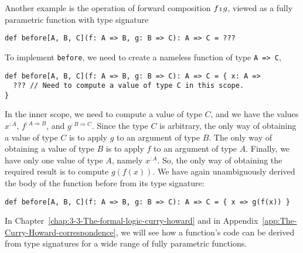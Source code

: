 Another example is the operation of forward composition $f\bef g$,
viewed as a fully parametric function with type signature
\begin{lstlisting}
def before[A, B, C](f: A => B, g: B => C): A => C = ???
\end{lstlisting}
To implement \lstinline!before!, we need to create a nameless function
of type \lstinline!A => C!,
\begin{lstlisting}
def before[A, B, C](f: A => B, g: B => C): A => C = { x: A =>
  ??? // Need to compute a value of type C in this scope.
}
\end{lstlisting}
In the inner scope, we need to compute a value of type $C$, and we
have the values $x^{:A}$, $f^{:A\Rightarrow B}$, and $g^{:B\Rightarrow C}$.
Since the type $C$ is arbitrary, the only way of obtaining a value
of type $C$ is to apply $g$ to an argument of type $B$. The only
way of obtaining a value of type $B$ is to apply $f$ to an argument
of type $A$. Finally, we have only one value of type $A$, namely
$x^{:A}$. So, the only way of obtaining the required result is to
compute $g(f(x))$. We have again unambiguously derived the body of
the function before from its type signature:
\begin{lstlisting}
def before[A, B, C](f: A => B, g: B => C): A => C = { x => g(f(x)) }
\end{lstlisting}

In Chapter~\ref{chap:3-3-The-formal-logic-curry-howard} and in Appendix~\ref{app:The-Curry-Howard-correspondence},
we will see how a function's code can be derived from type signatures
for a wide range of fully parametric functions.
